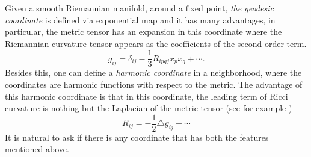\documentclass{amsart}
\numberwithin{equation}{section}
\begin{document}
Given a smooth Riemannian manifold, around a fixed point, {\it the geodesic coordinate} is defined via exponential map and it has many advantages, in particular, the metric tensor has an expansion in this coordinate where the Riemannian curvature tensor appears as the coefficients of the second order term. 
\begin{equation}
	\label{eqn:exp_geodesic}
	g_{ij}= \delta_{ij}- \frac{1}{3}R_{ipqj}x_p x_q + \cdots .
\end{equation}
Besides this, one can define a {\it harmonic coordinate} in a neighborhood, where the coordinates are harmonic functions with respect to the metric. The advantage of this harmonic coordinate is that in this coordinate, the leading term of Ricci curvature is nothing but the Laplacian of the metric tensor (see for example \cite{deturk})
\[
	R_{ij}= -\frac{1}{2}\triangle g_{ij} + \cdots 
\]
It is natural to ask if there is any coordinate that has both the features mentioned above. 
\end{document}

